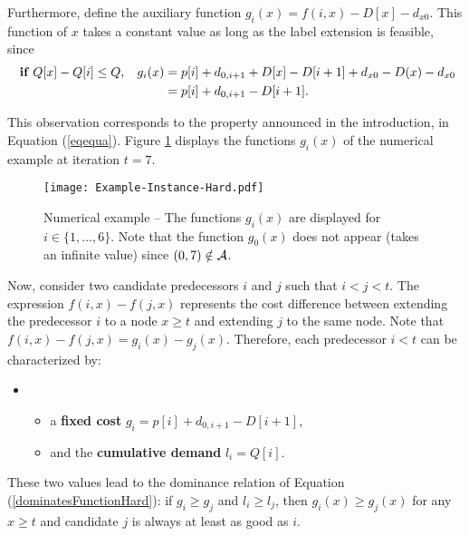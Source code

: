 \documentclass[11pt]{article}
\newcommand{\cA}{{\cal A}}
\begin{document}
Furthermore, define the auxiliary function $g_i(x) = f(i,x) - D[x] - d_{x0}$. This function of $x$ takes a constant value as long as the label extension is feasible, since
\begin{equation}
\begin{aligned}
\textbf{ if }  Q[x] - Q[i] \leq Q, \hspace{0.3cm} g_i(x) &= p[i] + d_{0,i+1} + D[x] - D[i+1] + d_{x0} - D(x) - d_{x0} \\
&= p[i] + d_{0,i+1} - D[i+1].
\end{aligned}
\end{equation}

This observation corresponds to the property announced in the introduction, in Equation (\ref{eqequa}).
Figure \ref{figure-hard} displays the functions $g_i(x)$ of the numerical example at iteration $t=7$.

\begin{figure}[htbp]
\centering
\texttt{[image: Example-Instance-Hard.pdf]}
\caption{Numerical example -- The functions $g_i(x)$ are displayed for $i \in \{1,\dots,6\}$. Note that the function $g_0(x)$ does not appear (takes an infinite value) since $(0,7) \notin \cA$.}
\label{figure-hard}
\end{figure}

Now, consider two candidate predecessors $i$ and $j$ such that $i < j < t$. The expression
$f(i,x) - f(j,x)$ represents the cost difference between extending the predecessor $i$ to a node $x \geq t$ and extending $j$ to the same node. Note that $f(i,x) - f(j,x) = g_i(x) - g_j(x)$. Therefore, each predecessor $i < t$ can be characterized by:
\begin{itemize}[nosep]
\item[]
\begin{itemize}[nosep]
\item a \textbf{fixed cost} $g_i = p[i] + d_{0,i+1} - D[i+1]$,
\item and the \textbf{cumulative demand} $l_i = Q[i]$.
\end{itemize}
\end{itemize}
These two values lead to the dominance relation of Equation (\ref{dominatesFunctionHard}): if $g_i \geq g_j$ and $l_i \geq l_j$, then $g_i(x) \geq g_j(x)$ for any $x \geq t$ and candidate $j$ is always at least as good as $i$.
\end{document}
